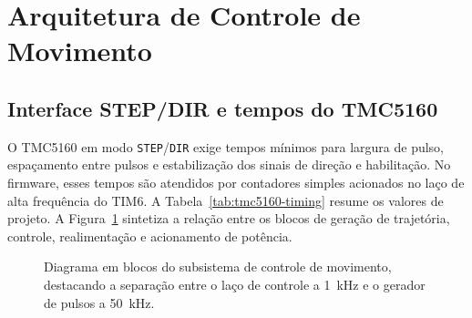 \section{Arquitetura de Controle de Movimento}
\label{sec:controle_movimento}

\subsection{Interface STEP/DIR e tempos do TMC5160}

O TMC5160 em modo \texttt{STEP}/\texttt{DIR} exige tempos m\'inimos para
largura de pulso, espa\c{c}amento entre pulsos e estabiliza\c{c}\~ao dos
sinais de dire\c{c}\~ao e habilita\c{c}\~ao. No firmware, esses tempos
s\~ao atendidos por contadores simples acionados no la\c{c}o de alta
frequ\^encia do TIM6. A Tabela~\ref{tab:tmc5160-timing} resume os valores
de projeto. A Figura~\ref{fig:controle-movimento-blocos} sintetiza a
rela\c{c}\~ao entre os blocos de gera\c{c}\~ao de trajet\'oria, controle,
realimenta\c{c}\~ao e acionamento de pot\^encia.

\begin{figure}[H]
    \centering
    \caption{Diagrama em blocos do subsistema de controle de movimento, destacando a separa\c{c}\~ao entre o la\c{c}o de controle a \SI{1}{\kilo\hertz} e o gerador de pulsos a \SI{50}{\kilo\hertz}.}
    \label{fig:controle-movimento-blocos}
\end{figure}

